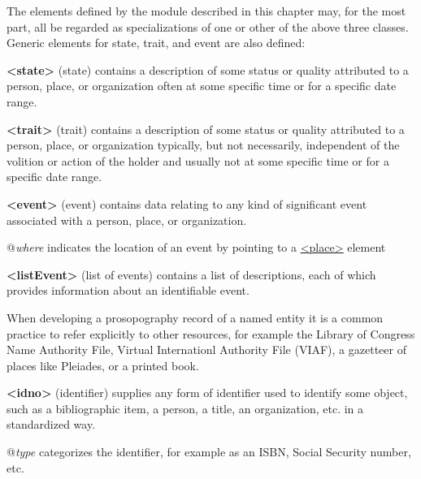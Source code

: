 The elements defined by the module described in this chapter may, for the most part, all be regarded as specializations of one or other of the above three classes. Generic elements for state, trait, and event are also defined: 
\begin{sansreflist}
  
\item [\textbf{<state>}] (state) contains a description of some status or quality attributed to a person, place, or organization often at some specific time or for a specific date range.
\item [\textbf{<trait>}] (trait) contains a description of some status or quality attributed to a person, place, or organization typically, but not necessarily, independent of the volition or action of the holder and usually not at some specific time or for a specific date range.
\item [\textbf{<event>}] (event) contains data relating to any kind of significant event associated with a person, place, or organization.\hfil\\[-10pt]\begin{sansreflist}
    \item[@{\itshape where}]
  indicates the location of an event by pointing to a \hyperref[TEI.place]{<place>} element
\end{sansreflist}  
\item [\textbf{<listEvent>}] (list of events) contains a list of descriptions, each of which provides information about an identifiable event.
\end{sansreflist}
\par
When developing a prosopography record of a named entity it is a common practice to refer explicitly to other resources, for example the Library of Congress Name Authority File, Virtual Internationl Authority File (VIAF), a gazetteer of places like Pleiades, or a printed book. 
\begin{sansreflist}
  
\item [\textbf{<idno>}] (identifier) supplies any form of identifier used to identify some object, such as a bibliographic item, a person, a title, an organization, etc. in a standardized way.\hfil\\[-10pt]\begin{sansreflist}
    \item[@{\itshape type}]
  categorizes the identifier, for example as an ISBN, Social Security number, etc.
\end{sansreflist}  
\end{sansreflist}
